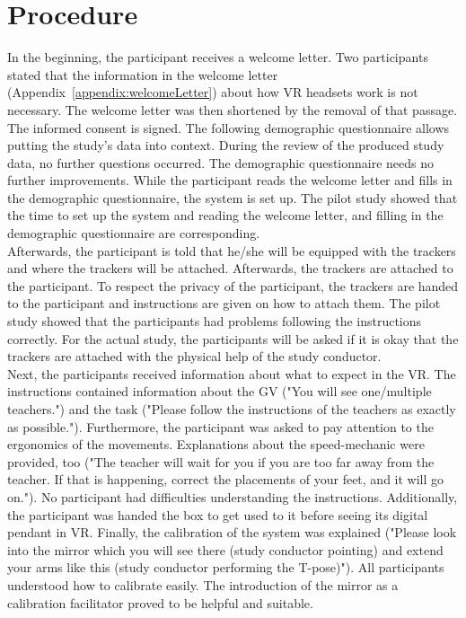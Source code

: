 \section{Procedure}
\label{sec:evalProcedure}
In the beginning, the participant receives a welcome letter. Two participants stated that the information in the welcome letter (Appendix~\ref{appendix:welcomeLetter}) about how VR headsets work is not necessary. The welcome letter was then shortened by the removal of that passage. The informed consent is signed. The following demographic questionnaire allows putting the study's data into context. During the review of the produced study data, no further questions occurred. The demographic questionnaire needs no further improvements. While the participant reads the welcome letter and fills in the demographic questionnaire, the system is set up. The pilot study showed that the time to set up the system and reading the welcome letter, and filling in the demographic questionnaire are corresponding.\\
Afterwards, the participant is told that he/she will be equipped with the trackers and where the trackers will be attached. Afterwards, the trackers are attached to the participant. To respect the privacy of the participant, the trackers are handed to the participant and instructions are given on how to attach them. The pilot study showed that the participants had problems following the instructions correctly. For the actual study, the participants will be asked if it is okay that the trackers are attached with the physical help of the study conductor.\\
Next, the participants received information about what to expect in the VR. The instructions contained information about the GV ("You will see one/multiple teachers.") and the task ("Please follow the instructions of the teachers as exactly as possible."). Furthermore, the participant was asked to pay attention to the ergonomics of the movements. Explanations about the speed-mechanic were provided, too ("The teacher will wait for you if you are too far away from the teacher. If that is happening, correct the placements of your feet, and it will go on."). No participant had difficulties understanding the instructions. Additionally, the participant was handed the box to get used to it before seeing its digital pendant in VR. Finally, the calibration of the system was explained ("Please look into the mirror which you will see there (study conductor pointing) and extend your arms like this (study conductor performing the T-pose)"). All participants understood how to calibrate easily. The introduction of the mirror as a calibration facilitator proved to be helpful and suitable.\\
